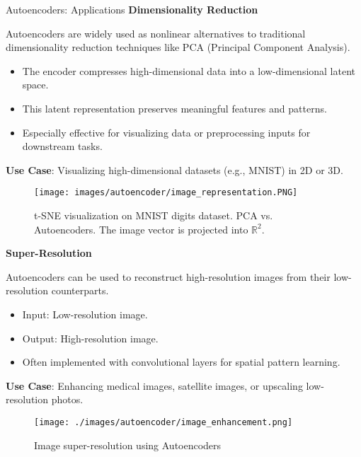 \begin{frame}[allowframebreaks]{Autoencoders: Applications}
\textbf{Dimensionality Reduction}

Autoencoders are widely used as nonlinear alternatives to traditional dimensionality reduction techniques like PCA (Principal Component Analysis).
\begin{itemize}
    \item The encoder compresses high-dimensional data into a low-dimensional latent space.
    \item This latent representation preserves meaningful features and patterns.
    \item Especially effective for visualizing data or preprocessing inputs for downstream tasks.
\end{itemize}
\textbf{Use Case}: Visualizing high-dimensional datasets (e.g., MNIST) in 2D or 3D.

\framebreak

\begin{figure}
    \centering
    \texttt{[image: images/autoencoder/image\_representation.PNG]}
    \caption{t-SNE visualization on MNIST digits dataset. PCA vs. Autoencoders. The image vector is projected into $\mathbb{R}^2$.}
\end{figure}

\framebreak

\textbf{Super-Resolution}

Autoencoders can be used to reconstruct high-resolution images from their low-resolution counterparts.

\begin{itemize}
    \item Input: Low-resolution image.
    \item Output: High-resolution image.
    \item Often implemented with convolutional layers for spatial pattern learning.
\end{itemize}
\textbf{Use Case}: Enhancing medical images, satellite images, or upscaling low-resolution photos.

\framebreak

\begin{figure}
    \centering
    \texttt{[image: ./images/autoencoder/image\_enhancement.png]}
    \caption{Image super-resolution using Autoencoders}
\end{figure}


\end{frame}
